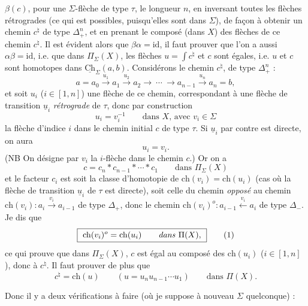 \documentclass[11pt]{article}
\newcommand{\msp}[1]{\marginpar{\vspace*{10pt}\footnotesize [#1]}}
\newcommand{\Ch}{\underline{\mathrm{Ch}}}
\newcommand{\ch}{\mathrm{ch}}
\newcommand{\id}{\mathrm{id}}
\begin{document}
$\beta(c)$, pour une $\Sigma$-flèche de type $\tau$, le longueur $n$, en inversant toutes les flèches rétrogrades (ce qui est possibles, puisqu'elles sont dans $\Sigma$), de façon à obtenir un chemin $c^\natural$ de type $\Delta_+^n$, et en prenant le composé (dans $X$) des flèches de ce chemin $c^\natural$. Il est évident alors que $\beta\alpha = \id$, il faut prouver que l'on a aussi $\alpha\beta = \id$, i.e. que dans $\Pi_\Sigma(X)$, les flèches $u = \int c^\natural$ et $c$ sont égales, i.e. $u$ et $c$ sont homotopes dans $\Ch_\Sigma(a,b)$. Considérons le chemin $c^\natural$, de type $\Delta_+^n$ : %
\[
a = a_0 \xrightarrow{u_1} a_1 \xrightarrow{u_2} a_2 \longrightarrow \ \cdots \ \longrightarrow a_{n-1} \xrightarrow{u_n} a_n = b,
\]
et soit $u_i$ ($i \in [1,n]$) une flèche de ce chemin, correspondant à une flèche de transition $\underline{u}_i$ \textit{rétrograde} de $\tau$, donc par construction
\[
u_i = v_i^{-1} \qquad \text{dans } X\text{, avec } v_i \in \Sigma
\]
la flèche d'indice $i$ dans le chemin initial $c$ de type $\tau$. Si $\underline{u}_i$ par contre est directe, on aura
\[
u_i = v_i.
\]
(NB On désigne par $v_i$ la $i$-flèche dans le chemin $c$.) Or on a
\[
c = c_n * c_{n-1} * \cdots * c_1 \qquad \text{dans } \Pi_\Sigma(X)
\tag*{$(*)$}
\]
et le facteur $c_i$ est soit la classe d'homotopie de $\ch(v_i) = \ch(u_i)$ (cas où la flèche de transition $\underline{u}_i$ de $\tau$ est directe), soit celle du chemin \textit{opposé} au chemin $\ch(v_i) : a_i \xrightarrow{v_i} a_{i-1}$ de type $\Delta_+$, donc le chemin $\ch(v_i)^o : a_{i-1} \xleftarrow{v_i} a_i$ de type $\Delta_-$. Je dis que
\[
\boxed{\ \ch(v_i)^o = \ch(u_i) \qquad \text{\textit{dans} } \Pi(X),\ }
\tag*{(1)}
\]
ce qui prouve que dans $\Pi_\Sigma(X)$, $c$ est égal au composé des $\ch(u_i)$ ($i \in [1,n]$), donc à $c^\natural$. Il faut prouver de plus que
\[
c^\natural = \ch(u) \qquad (u = u_nu_{n-1}\cdots u_1) \qquad \text{dans } \Pi(X).
\tag*{(2)}
\]

\msp{page 70}

Donc il y a deux vérifications à faire (où je suppose à nouveau $\Sigma$ quelconque) :
\end{document}
